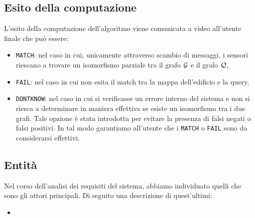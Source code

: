 \documentclass{llncs}
\begin{document}
\subsection{Esito della computazione}
L'esito della computazione dell'algoritmo viene comunicata a video all'utente finale che può essere:
\begin{itemize}
\item \texttt{MATCH}: nel caso in cui, unicamente attraverso scambio di messaggi, i sensori riescano a trovare
  un isomorfismo parziale tra il grafo $\mathcal{G}$ e il grafo $\mathcal{Q}$,
\item \texttt{FAIL}: nel caso in cui non esita il match tra la mappa dell'edificio e la query,
\item \texttt{DONTKNOW}: nel caso in cui si verificasse un errore interno del sistema e
  non si riesca a determinare in maniera effettiva se esiste un isomorfismo tra i due grafi. Tale opzione
  è stata introdotta per evitare la presenza di falsi negati o falsi positivi. In tal modo garantiamo all'utente
  che i  \texttt{MATCH} o \texttt{FAIL} sono da considerarsi effettivi.
\end{itemize}

\subsection{Entità}
Nel corso dell'analisi dei requisiti del sistema, abbiamo individuato quelli che sono 
gli attori principali. Di seguito una descrizione di quest'ultimi:
\begin{itemize}
	\item 
\end{itemize}
\end{document}
